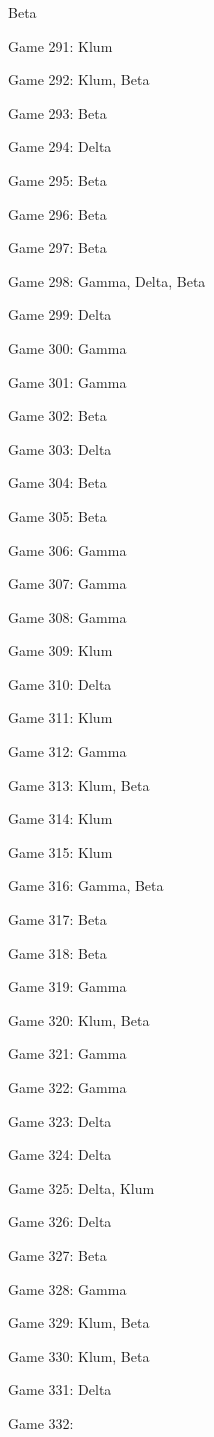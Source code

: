 \documentclass{article}
\begin{document}
\begin{multicols}{3}
\begin{compactitem}
Beta
\item Game 291:
Klum
\item Game 292:
Klum, Beta
\item Game 293:
Beta
\item Game 294:
Delta
\item Game 295:
Beta
\item Game 296:
Beta
\item Game 297:
Beta
\item Game 298:
Gamma, Delta, Beta
\item Game 299:
Delta
\item Game 300:
Gamma
\item Game 301:
Gamma
\item Game 302:
Beta
\item Game 303:
Delta
\item Game 304:
Beta
\item Game 305:
Beta
\item Game 306:
Gamma
\item Game 307:
Gamma
\item Game 308:
Gamma
\item Game 309:
Klum
\item Game 310:
Delta
\item Game 311:
Klum
\item Game 312:
Gamma
\item Game 313:
Klum, Beta
\item Game 314:
Klum
\item Game 315:
Klum
\item Game 316:
Gamma, Beta
\item Game 317:
Beta
\item Game 318:
Beta
\item Game 319:
Gamma
\item Game 320:
Klum, Beta
\item Game 321:
Gamma
\item Game 322:
Gamma
\item Game 323:
Delta
\item Game 324:
Delta
\item Game 325:
Delta, Klum
\item Game 326:
Delta
\item Game 327:
Beta
\item Game 328:
Gamma
\item Game 329:
Klum, Beta
\item Game 330:
Klum, Beta
\item Game 331:
Delta
\item Game 332:

\end{compactitem}
\end{multicols}
\end{document}
